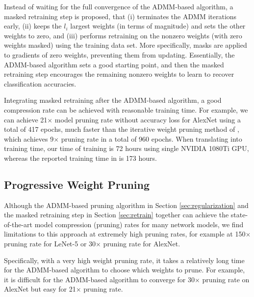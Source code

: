 \documentclass{article} %
\begin{document}
Instead of waiting for the full convergence of the ADMM-based algorithm, a masked retraining step is proposed, that (i) terminates the ADMM iterations early, (ii) keeps the $l_i$ largest weights (in terms of magnitude) and sets the other weights to zero, and (iii) performs retraining on the nonzero weights (with zero weights masked) using the training data set.
More specifically, masks are applied to gradients of zero weights, preventing them from updating.
Essentially, the ADMM-based algorithm sets a good starting point, and then the masked retraining step encourages the remaining nonzero weights to learn to recover classification accuracies.

Integrating masked retraining after the ADMM-based algorithm, a good compression rate can be achieved with reasonable training time. For example, we can achieve 21$\times$ model pruning rate without accuracy loss for AlexNet using a total of 417 epochs, much faster than the iterative weight pruning method of \citet{han2015deep}, which achieves 9$\times$ pruning rate in a total of 960 epochs. When translating into training time, our time of training is 72 hours using single NVIDIA 1080Ti GPU, whereas the reported training time in \citet{han2015deep} is 173 hours.
 


\subsection{Progressive Weight Pruning}\label{sec:proposed}

Although the ADMM-based pruning algorithm in Section \ref{sec:regularization} and the masked retraining step in Section \ref{sec:retrain} together can achieve the state-of-the-art model compression (pruning) rates for many network models, we find limitations to this  approach at extremely high pruning rates, for example at 150$\times$ pruning rate for LeNet-5 or 30$\times$ pruning rate for AlexNet. 

Specifically, with a very high weight pruning rate, it takes a relatively long time for the ADMM-based algorithm to choose which weights to prune. 
For example, it is difficult for the ADMM-based algorithm to converge for 30$\times$ pruning rate on AlexNet but easy for 21$\times$ pruning rate.
\end{document}
